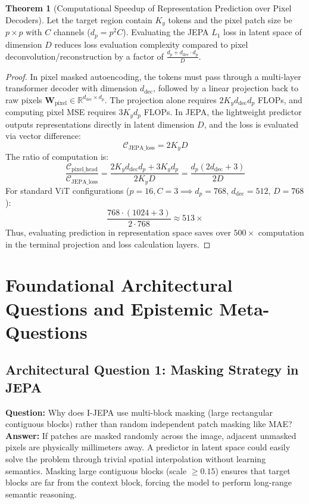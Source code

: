\documentclass[11pt,a4paper]{article}
\theoremstyle{definition}
\newtheorem{theorem}{\textbf{Theorem}}[section]
\begin{document}
\begin{theorem}[Computational Speedup of Representation Prediction over Pixel Decoders]
Let the target region contain $K_y$ tokens and the pixel patch size be $p \times p$ with $C$ channels ($d_p = p^2 C$). Evaluating the JEPA $L_1$ loss in latent space of dimension $D$ reduces loss evaluation complexity compared to pixel deconvolution/reconstruction by a factor of $\frac{d_p + d_{\text{dec}} \cdot d_p}{D}$.
\end{theorem}

\begin{proof}
In pixel masked autoencoding, the tokens must pass through a multi-layer transformer decoder with dimension $d_{\text{dec}}$, followed by a linear projection back to raw pixels $\mathbf{W}_{\text{pixel}} \in \mathbb{R}^{d_{\text{dec}} \times d_p}$.
The projection alone requires $2 K_y d_{\text{dec}} d_p$ FLOPs, and computing pixel MSE requires $3 K_y d_p$ FLOPs.
In JEPA, the lightweight predictor outputs representations directly in latent dimension $D$, and the loss is evaluated via vector difference:
{\boldmath
\begin{equation}
\mathcal{C}_{\text{JEPA\_loss}} = 2 K_y D
\end{equation}
}
The ratio of computation is:
{\boldmath
\begin{equation}
\frac{\mathcal{C}_{\text{pixel\_head}}}{\mathcal{C}_{\text{JEPA\_loss}}} = \frac{2 K_y d_{\text{dec}} d_p + 3 K_y d_p}{2 K_y D} = \frac{d_p (2 d_{\text{dec}} + 3)}{2 D}
\end{equation}
}
For standard ViT configurations ($p = 16, C = 3 \implies d_p = 768$, $d_{\text{dec}} = 512$, $D = 768$):
{\boldmath
\begin{equation}
\frac{768 \cdot (1024 + 3)}{2 \cdot 768} \approx 513\times
\end{equation}
}
Thus, evaluating prediction in representation space saves over $500\times$ computation in the terminal projection and loss calculation layers.
\end{proof}

\section{Foundational Architectural Questions and Epistemic Meta-Questions}

\subsection{Architectural Question 1: Masking Strategy in JEPA}
\textbf{Question:} Why does I-JEPA use multi-block masking (large rectangular contiguous blocks) rather than random independent patch masking like MAE?\\
\textbf{Answer:} If patches are masked randomly across the image, adjacent unmasked pixels are physically millimeters away. A predictor in latent space could easily solve the problem through trivial spatial interpolation without learning semantics. Masking large contiguous blocks (scale $\ge 0.15$) ensures that target blocks are far from the context block, forcing the model to perform long-range semantic reasoning.
\end{document}
